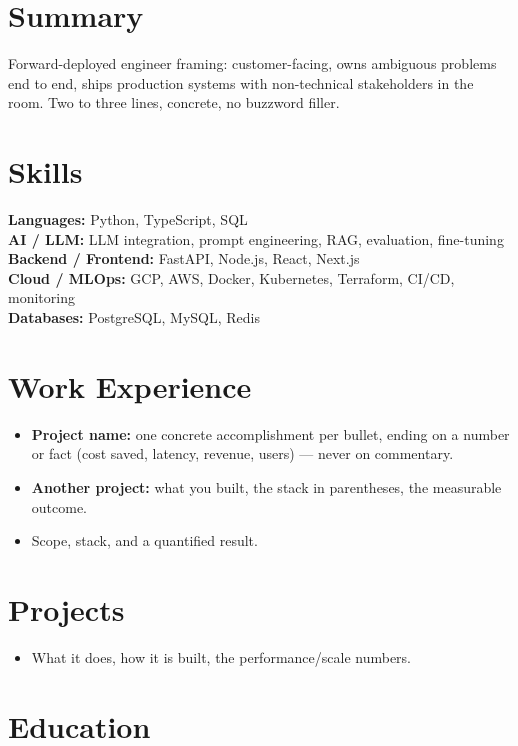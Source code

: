 \documentclass[10pt]{article}
\begin{document}

\section{Summary}
Forward-deployed engineer framing: customer-facing, owns ambiguous problems end to end, ships production systems with non-technical stakeholders in the room. Two to three lines, concrete, no buzzword filler.

\section{Skills}
\textbf{Languages:} Python, TypeScript, SQL \\
\textbf{AI / LLM:} LLM integration, prompt engineering, RAG, evaluation, fine-tuning \\
\textbf{Backend / Frontend:} FastAPI, Node.js, React, Next.js \\
\textbf{Cloud / MLOps:} GCP, AWS, Docker, Kubernetes, Terraform, CI/CD, monitoring \\
\textbf{Databases:} PostgreSQL, MySQL, Redis

\section{Work Experience}
\begin{itemize}
  \item \textbf{Project name:} one concrete accomplishment per bullet, ending on a number or fact (cost saved, latency, revenue, users) --- never on commentary.
  \item \textbf{Another project:} what you built, the stack in parentheses, the measurable outcome.
\end{itemize}
\begin{itemize}
  \item Scope, stack, and a quantified result.
\end{itemize}

\section{Projects}
\begin{itemize}
  \item What it does, how it is built, the performance/scale numbers.
\end{itemize}

\section{Education}
\end{document}
